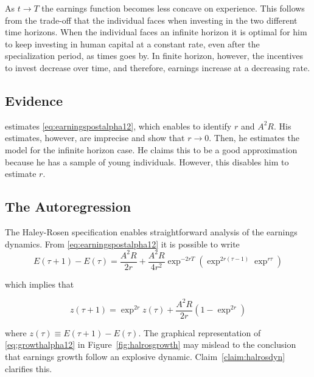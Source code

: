 \noindent As $t \rightarrow T$ the earnings function becomes less concave on experience. This follows from the trade-off that the individual faces when investing in the two different time horizons. When the individual faces an infinite horizon it is optimal for him to keep investing in human capital at a constant rate, even after the specialization period, as times goes by. In finite horizon, however, the incentives to invest decrease over time, and therefore, earnings increase at a decreasing rate. 

\subsection{Evidence}
\citet{brown1976model} estimates \eqref{eq:earningspostalpha12}, which enables to identify $r$ and $A^2 R$. His estimates, however, are imprecise and show that $r \rightarrow 0$. Then, he estimates the model for the infinite horizon case. He claims this to be a good approximation because he has a sample of young individuals. However, this disables him to estimate $r$.

\subsection{The Autoregression}
The Haley-Rosen specification enables straightforward analysis of the earnings dynamics. From \eqref{eq:earningspostalpha12} it is possible to write
\begin{equation}
E(\tau + 1) - E(\tau) =  \frac{A^2 R}{2r}+ \frac{A^2 R}{4r^2} \exp^{-2rT} \left( \exp^{2r(\tau - 1)} \exp^{r \tau} \right) 
\end{equation}

\noindent which implies that

\begin{equation}
z(\tau + 1) = \exp^{2r} z(\tau) + \frac{A^2 R}{2r} \left( 1 - \exp^{2r} \right) \label{eq:growthalpha12}
\end{equation}

\noindent where $z(\tau) \equiv  E(\tau + 1) - E(\tau)$. The graphical representation of \eqref{eq:growthalpha12} in Figure~\ref{fig:halrosgrowth} may mislead to the conclusion that earnings growth follow an explosive dynamic. Claim~\ref{claim:halrosdyn} clarifies this. 

